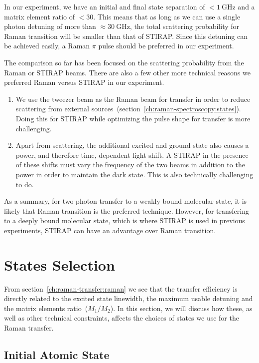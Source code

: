 In our experiment, we have an initial and final state separation of $<\!1~\mathrm{GHz}$
and a matrix element ratio of $<\!30$.
This means that as long as we can use a single photon detuning of more than
$\approx\!30~\mathrm{GHz}$, the total scattering probability for Raman transition
will be smaller than that of STIRAP.
Since this detuning can be achieved easily,
a Raman $\pi$ pulse should be preferred in our experiment.

The comparison so far has been focused on the scattering probability from the Raman or STIRAP
beams. There are also a few other more technical reasons we preferred Raman versus STIRAP
in our experiment.

\begin{enumerate}
\item We use the tweezer beam as the Raman beam for transfer in order to reduce scattering
  from external sources~(section~\ref{ch:raman-spectroscopy:states}).
  Doing this for STIRAP while optimizing the pulse shape for transfer is more challenging.
\item Apart from scattering, the additional excited and ground state
  also causes a power, and therefore time, dependent light shift.
  A STIRAP in the presence of these shifts must vary the frequency of the two beams
  in addition to the power in order to maintain the dark state.
  This is also technically challenging to do.
\end{enumerate}

As a summary, for two-photon transfer to a weakly bound molecular state,
it is likely that Raman transition is the preferred technique.
However, for transfering to a deeply bound molecular state,
which is where STIRAP is used in previous experiments,
STIRAP can have an advantage over Raman transition.

\section{States Selection}
\label{ch:raman-transfer:state-selection}

From section~\ref{ch:raman-transfer:raman} we see that the transfer efficiency
is directly related to the excited state linewidth, the maximum usable detuning
and the matrix elements ratio~($M_1/M_2$).
In this section, we will discuss how these, as well as other technical constraints,
affects the choices of states we use for the Raman transfer.

\subsection{Initial Atomic State}
\label{ch:raman-transfer:state-selection:init}

